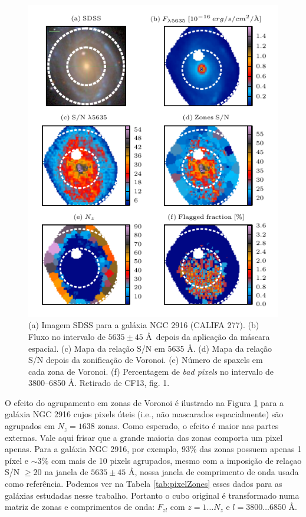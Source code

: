 \begin{figure}
	\includegraphics[width=1.0\textwidth]{figuras/figCF13fig1.pdf}
    \caption[Máscara espacial, zonas de Voronoi e flags para a galáxia NGC 2916 (CALIFA 277).]
    {(a) Imagem SDSS para a galáxia NGC 2916 (CALIFA 277). (b) Fluxo no intervalo de $5635 \pm 45$ \AA\ depois da
    aplicação da máscara espacial. (c) Mapa da relação S/N em 5635 \AA. (d) Mapa da relação S/N depois da zonificação de
    Voronoi. (e) Número de spaxels em cada zona de Voronoi. (f) Percentagem de {\em bad pixels} no intervalo
    de 3800--6850 \AA. Retirado de CF13, fig. 1.}
   	\label{fig:zonesfig1CF13}
\end{figure}

O efeito do agrupamento em zonas de Voronoi é ilustrado na Figura \ref{fig:zonesfig1CF13} para a galáxia NGC 2916 cujos
pixels úteis (i.e., não mascarados espacialmente) são agrupados em $N_z = 1638$ zonas. Como esperado, o efeito é maior
nas partes externas. Vale aqui frisar que a grande maioria das zonas comporta um pixel apenas. Para a galáxia NGC 2916,
por exemplo, $93\%$ das zonas possuem apenas 1 píxel e $\sim 3\%$ com mais de 10 pixels agrupados, mesmo com a imposição
de relaçao S/N $\ge 20$ na janela de $5635 \pm 45$ \AA, nossa janela de comprimento de onda usada como referência.
Podemos ver na Tabela \ref{tab:pixelZones} esses dados para as galáxias estudadas nesse trabalho. Portanto o cubo
original é transformado numa matriz de zonas e comprimentos de onda: $F_{zl}$ com $z = 1 \ldots N_z$ e $l = 3800 \ldots
6850$ \AA.

